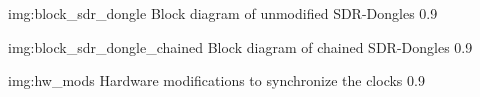 

\usepackage{antalike_en}


 \anttitle

 

 

              {img:block_sdr_dongle}
              {Block diagram of unmodified SDR-Dongles}
              {0.9}

              {img:block_sdr_dongle_chained}
              {Block diagram of chained SDR-Dongles}
              {0.9}

              {img:hw_mods}
              {Hardware modifications to synchronize the clocks}
              {0.9}

